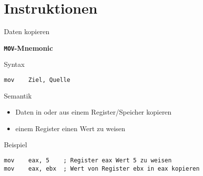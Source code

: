 \section{Instruktionen}

\begin{frame}[fragile]{Daten kopieren}

\begin{center}
\textbf{\texttt{MOV}-Mnemonic}
\end{center}

Syntax
\begin{lstlisting}
mov    Ziel, Quelle
\end{lstlisting}

\makebox{}

Semantik
\begin{itemize}
    \item Daten in oder aus einem Register/Speicher kopieren
    \item einem Register einen Wert zu weisen
\end{itemize}

\makebox{}

Beispiel
\begin{lstlisting}
mov    eax, 5    ; Register eax Wert 5 zu weisen
mov    eax, ebx  ; Wert von Register ebx in eax kopieren
\end{lstlisting}

\end{frame}

